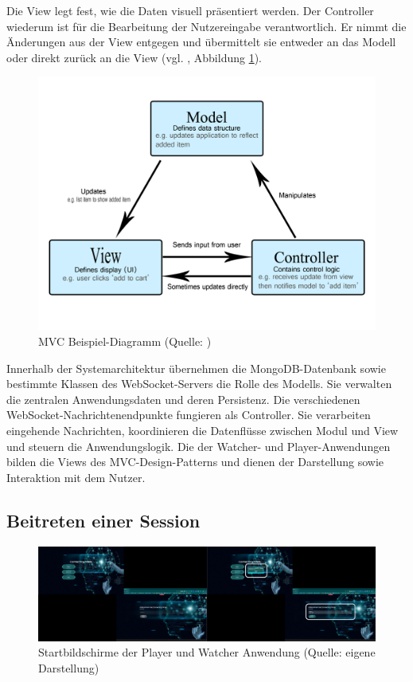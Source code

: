 Die View legt fest, wie die Daten visuell präsentiert werden. Der Controller wiederum ist für die Bearbeitung der Nutzereingabe verantwortlich. Er nimmt die Änderungen aus der View entgegen und übermittelt sie entweder an das Modell oder direkt zurück an die View (vgl. \citealp{mills_mvc_2025}, Abbildung \ref{fig:mvc-diagramm}).

\begin{figure}[ht]
\centering
\includegraphics[width=1\linewidth]{content/pictures/mvc-architecture.png}
\caption{\ac{MVC} Beispiel-Diagramm (Quelle: \cite{mills_mvc_2025})}
\label{fig:mvc-diagramm}
\end{figure}

Innerhalb der Systemarchitektur übernehmen die MongoDB-Datenbank sowie bestimmte Klassen des WebSocket-Servers die Rolle des Modells. Sie verwalten die zentralen Anwendungsdaten und deren Persistenz. Die verschiedenen WebSocket-Nachrichtenendpunkte fungieren als Controller. Sie verarbeiten eingehende Nachrichten, koordinieren die Datenflüsse zwischen Modul und View und steuern die Anwendungslogik. Die  der Watcher- und Player-Anwendungen bilden die Views des \ac{MVC}-Design-Patterns und dienen der Darstellung sowie Interaktion mit dem Nutzer.

\subsection{Beitreten einer Session}

\begin{figure}[ht]
\centering
\includegraphics[width=1\linewidth]{content/pictures/Login_Login_by_ID.png}
\caption{Startbildschirme der Player und Watcher Anwendung (Quelle: eigene Darstellung)}
\label{fig:old-logins}
\end{figure}

